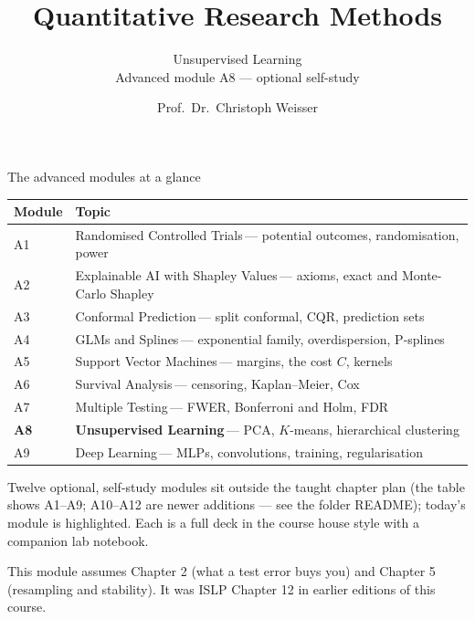 \documentclass[aspectratio=169,11pt]{beamer}
\title{Quantitative Research Methods}
\subtitle{Unsupervised Learning\\[2pt]{\small Advanced module A8 --- optional self-study}}
\author{Prof.\ Dr.\ Christoph Weisser}
\date{}\graphicspath{{images/}}
\begin{document}
\begin{frame}[plain]\titlepage\end{frame}

\begin{frame}{The advanced modules at a glance}
  \vspace{-1.5mm}
  \begin{center}
  \scriptsize
  \setlength{\tabcolsep}{5pt}
  \renewcommand{\arraystretch}{1.30}
  \begin{tabular}{@{\hspace{2pt}}l >{\raggedright\arraybackslash}p{}@{\hspace{2pt}}}
    \toprule
    \textbf{Module} & \textbf{Topic} \\
    \midrule
     {\color{accent}A1} & Randomised Controlled Trials\,{\color{black!45}--- potential outcomes, randomisation, power} \\
    \rowcolor{black!3} {\color{accent}A2} & Explainable AI with Shapley Values\,{\color{black!45}--- axioms, exact and Monte-Carlo Shapley} \\
     {\color{accent}A3} & Conformal Prediction\,{\color{black!45}--- split conformal, CQR, prediction sets} \\
    \rowcolor{black!3} {\color{accent}A4} & GLMs and Splines\,{\color{black!45}--- exponential family, overdispersion, P-splines} \\
     {\color{accent}A5} & Support Vector Machines\,{\color{black!45}--- margins, the cost $C$, kernels} \\
    \rowcolor{black!3} {\color{accent}A6} & Survival Analysis\,{\color{black!45}--- censoring, Kaplan--Meier, Cox} \\
     {\color{accent}A7} & Multiple Testing\,{\color{black!45}--- FWER, Bonferroni and Holm, FDR} \\
    \rowcolor{accent!18} \textbf{A8} & \textbf{Unsupervised Learning}\,{\color{accent!75!black}--- PCA, $K$-means, hierarchical clustering} \\
     {\color{accent}A9} & Deep Learning\,{\color{black!45}--- MLPs, convolutions, training, regularisation} \\
    \bottomrule
  \end{tabular}
  \end{center}
  \vspace{2mm}
  {\scriptsize Twelve optional, self-study modules sit outside the taught
  chapter plan (the table shows A1--A9; A10--A12 are newer additions --- see the folder README); today's module is highlighted. Each is a full deck in the course
  house style with a companion lab notebook.\par\medskip This module assumes Chapter 2 (what a test error buys you) and Chapter 5 (resampling and stability). It was ISLP Chapter 12 in earlier editions of this course.}
\end{frame}
\end{document}
